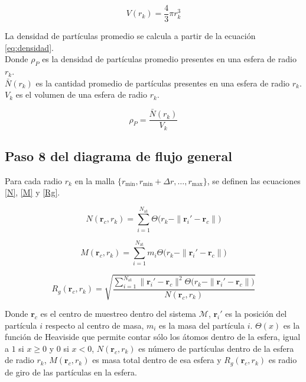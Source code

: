 	 
	 \begin{equation}
	 	V(r_k) = \frac{4}{3} \pi r_{k}^{3}
	 	\label{volumen}
	 \end{equation}
	 
	 La densidad de part\'{i}culas promedio se calcula a partir de la ecuaci\'{o}n \ref{eq:densidad}. \\
	 Donde \(\rho_{P}\) es la densidad de part\'{i}culas promedio presentes en una esfera de radio \(r_k\).\\
	 \(\bar N(r_{k})\) es la cantidad promedio de part\'{i}culas presentes en una esfera de radio \(r_k\).
	 \(V_{k}\) es el volumen de una esfera de radio \(r_{k}\).
	 
	 \begin{equation}
	 	\rho_P = \frac{\bar N(r_{k})}{V_{k}}
	 	\label{eq:densidad}
	 \end{equation}
	 

	\subsection{Paso 8 del diagrama de flujo general}

	Para cada radio $r_k$ en la malla $\{r_{\text{min}}, r_{\text{min}} + \Delta r, \ldots, r_{\text{max}}\}$, se definen las ecuaciones \ref{N}, \ref{M} y \ref{Rg}.
	
	\begin{equation}
		N(\mathbf{r}_c, r_k) = \sum_{i=1}^{N_{\text{at}}} 
		\Theta\!\bigl(r_k - \|\mathbf{r}_i' - \mathbf{r}_c\|\bigr)
		\label{N}
	\end{equation}
	
	\begin{equation}
		M(\mathbf{r}_c, r_k) = \sum_{i=1}^{N_{\text{at}}} 
		m_i \Theta\!\bigl(r_k - \|\mathbf{r}_i' - \mathbf{r}_c\|\bigr)
		\label{M}
	\end{equation}
	
	\begin{equation}
		R_g(\mathbf{r}_c, r_k) = 
		\sqrt{\frac{\displaystyle\sum_{i=1}^{N_{\text{at}}} 
				\|\mathbf{r}_i' - \mathbf{r}_c\|^2  
				\Theta\!\bigl(r_k - \|\mathbf{r}_i' - \mathbf{r}_c\|\bigr)}
			{N(\mathbf{r}_c, r_k)}}
		\label{Rg}
	\end{equation}
	
	Donde $\mathbf{r}_c$ es el centro de muestreo dentro del sistema $\mathcal{M}$,
	$\mathbf{r}_i'$ es la posición del partícula $i$ respecto al centro de masa, 
	$m_i$ es la masa del partícula $i$. $\Theta(x)$ es la función de Heaviside que permite contar sólo los átomos dentro de la esfera, igual a $1$ si $x \ge 0$ y $0$ si $x < 0$, $N(\mathbf{r}_c, r_k)$ es número de partículas dentro de la esfera de radio $r_k$, $M(\mathbf{r}_c, r_k)$ es masa total dentro de esa esfera y 
	$R_g(\mathbf{r}_c, r_k)$ es radio de giro de las partículas en la esfera.
	
